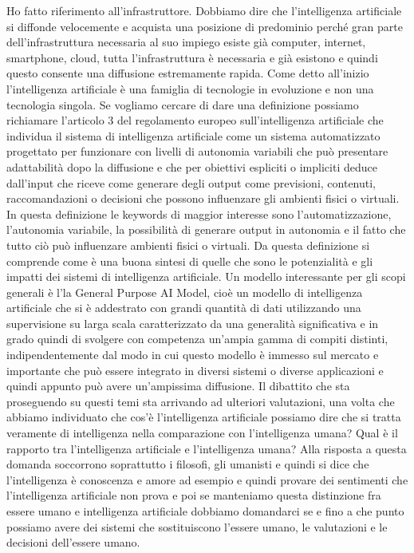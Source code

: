 Ho fatto riferimento all'infrastruttore.
Dobbiamo dire che l'intelligenza artificiale si diffonde velocemente e acquista una posizione di predominio perché gran parte dell'infrastruttura necessaria al suo impiego esiste già computer, internet, smartphone, cloud, tutta l'infrastruttura è necessaria e già esistono e quindi questo consente una diffusione estremamente rapida.
Come detto all'inizio l'intelligenza artificiale è una famiglia di tecnologie in evoluzione e non una tecnologia singola.
Se vogliamo cercare di dare una definizione possiamo richiamare l'articolo 3 del regolamento europeo sull'intelligenza artificiale che individua il sistema di intelligenza artificiale come un sistema automatizzato progettato per funzionare con livelli di autonomia variabili che può presentare adattabilità dopo la diffusione e che per obiettivi espliciti o impliciti deduce dall'input che riceve come generare degli output come previsioni, contenuti, raccomandazioni o decisioni che possono influenzare gli ambienti fisici o virtuali.
In questa definizione le keywords di maggior interesse sono l'automatizzazione, l'autonomia variabile, la possibilità di generare output in autonomia e il fatto che tutto ciò può influenzare ambienti fisici o virtuali.
Da questa definizione si comprende come è una buona sintesi di quelle che sono le potenzialità e gli impatti dei sistemi di intelligenza artificiale.
Un modello interessante per gli scopi generali è l'la General Purpose AI Model, cioè un modello di intelligenza artificiale che si è addestrato con grandi quantità di dati utilizzando una supervisione su larga scala caratterizzato da una generalità significativa e in grado quindi di svolgere con competenza un'ampia gamma di compiti distinti, indipendentemente dal modo in cui questo modello è immesso sul mercato e importante che può essere integrato in diversi sistemi o diverse applicazioni e quindi appunto può avere un'ampissima diffusione.
Il dibattito che sta proseguendo su questi temi sta arrivando ad ulteriori valutazioni, una volta che abbiamo individuato che cos'è l'intelligenza artificiale possiamo dire che si tratta veramente di intelligenza nella comparazione con l'intelligenza umana?
Qual è il rapporto tra l'intelligenza artificiale e l'intelligenza umana?
Alla risposta a questa domanda soccorrono soprattutto i filosofi, gli umanisti e quindi si dice che l'intelligenza è conoscenza e amore ad esempio e quindi provare dei sentimenti che l'intelligenza artificiale non prova e poi se manteniamo questa distinzione fra essere umano e intelligenza artificiale dobbiamo domandarci se e fino a che punto possiamo avere dei sistemi che sostituiscono l'essere umano, le valutazioni e le decisioni dell'essere umano.
